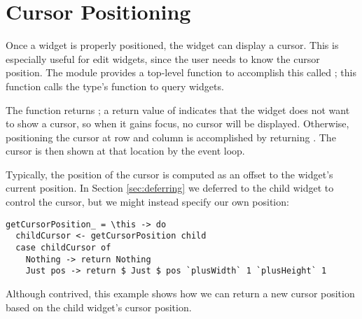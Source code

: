 \section{Cursor Positioning}

Once a widget is properly positioned, the widget can display a cursor.
This is especially useful for edit widgets, since the user needs to
know the cursor position.  The  module provides a top-level
function to accomplish this called ; this
function calls the  type's 
function to query widgets.

The  function returns ; a return value of  indicates that the
widget does not want to show a cursor, so when it gains focus, no
cursor will be displayed.  Otherwise, positioning the cursor at row
 and column  is accomplished by returning .  The cursor is then shown at that location by
the event loop.

Typically, the position of the cursor is computed as an offset to the
widget's current position.  In Section \ref{sec:deferring} we deferred
to the child widget to control the cursor, but we might instead
specify our own position:

\begin{verbatim}
getCursorPosition_ = \this -> do
  childCursor <- getCursorPosition child
  case childCursor of
    Nothing -> return Nothing
    Just pos -> return $ Just $ pos `plusWidth` 1 `plusHeight` 1
\end{verbatim}

Although contrived, this example shows how we can return a new cursor
position based on the child widget's cursor position.
